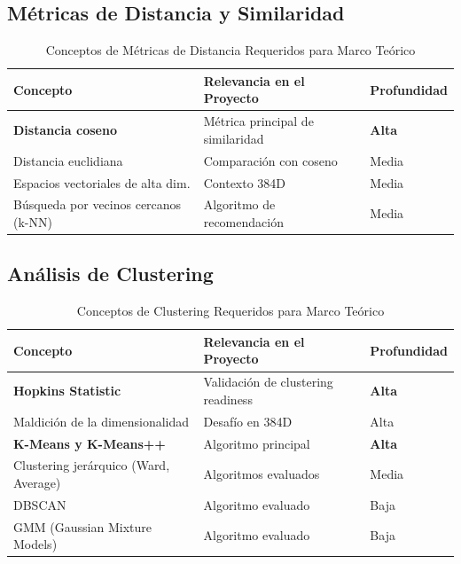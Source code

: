 \subsection{Métricas de Distancia y Similaridad}

\begin{table}[htbp]
\centering
\caption{Conceptos de Métricas de Distancia Requeridos para Marco Teórico}
\label{tab:conceptos-distancia}
\begin{tabular}{lll}
\toprule
\textbf{Concepto} & \textbf{Relevancia en el Proyecto} & \textbf{Profundidad} \\
\midrule
\textbf{Distancia coseno} & Métrica principal de similaridad & \textbf{Alta} \\
Distancia euclidiana & Comparación con coseno & Media \\
Espacios vectoriales de alta dim. & Contexto 384D & Media \\
Búsqueda por vecinos cercanos (k-NN) & Algoritmo de recomendación & Media \\
\bottomrule
\end{tabular}
\end{table}

\subsection{Análisis de Clustering}

\begin{table}[htbp]
\centering
\caption{Conceptos de Clustering Requeridos para Marco Teórico}
\label{tab:conceptos-clustering}
\begin{tabular}{lll}
\toprule
\textbf{Concepto} & \textbf{Relevancia en el Proyecto} & \textbf{Profundidad} \\
\midrule
\textbf{Hopkins Statistic} & Validación de clustering readiness & \textbf{Alta} \\
Maldición de la dimensionalidad & Desafío en 384D & Alta \\
\textbf{K-Means y K-Means++} & Algoritmo principal & \textbf{Alta} \\
Clustering jerárquico (Ward, Average) & Algoritmos evaluados & Media \\
DBSCAN & Algoritmo evaluado & Baja \\
GMM (Gaussian Mixture Models) & Algoritmo evaluado & Baja \\
\bottomrule
\end{tabular}
\end{table}

